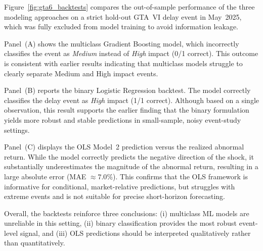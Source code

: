 \documentclass[11pt,a4paper]{article}
\begin{document}
Figure~\ref{fig:gta6_backtests} compares the out-of-sample performance of the three modeling approaches on a strict hold-out GTA~VI delay event in May~2025, which was fully excluded from model training to avoid information leakage.

Panel~(A) shows the multiclass Gradient Boosting model, which incorrectly classifies the event as \textit{Medium} instead of \textit{High} impact (0/1 correct). This outcome is consistent with earlier results indicating that multiclass models struggle to clearly separate Medium and High impact events.

Panel~(B) reports the binary Logistic Regression backtest. The model correctly classifies the delay event as \textit{High} impact (1/1 correct). Although based on a single observation, this result supports the earlier finding that the binary formulation yields more robust and stable predictions in small-sample, noisy event-study settings.

Panel~(C) displays the OLS Model~2 prediction versus the realized abnormal return. While the model correctly predicts the negative direction of the shock, it substantially underestimates the magnitude of the abnormal return, resulting in a large absolute error (MAE $\approx 7.0\%$). This confirms that the OLS framework is informative for conditional, market-relative predictions, but struggles with extreme events and is not suitable for precise short-horizon forecasting.

Overall, the backtests reinforce three conclusions: (i) multiclass ML models are unreliable in this setting, (ii) binary classification provides the most robust event-level signal, and (iii) OLS predictions should be interpreted qualitatively rather than quantitatively.
\end{document}
